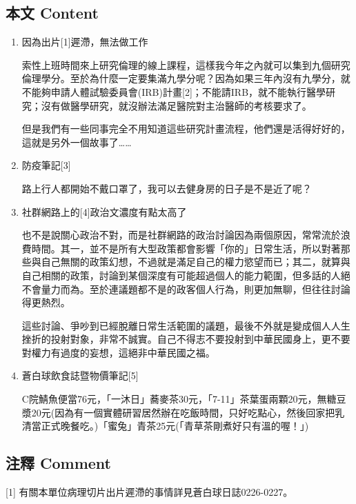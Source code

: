 \documentclass[a5paper, 12pt
]{book}
\begin{document}
\hypertarget{ux672cux6587-content-75}{%
\subsection{本文 Content}\label{ux672cux6587-content-75}}

\begin{enumerate}
\def\labelenumi{\arabic{enumi}.}
\item
  因為出片{[}1{]}遲滯，無法做工作

  索性上班時間來上研究倫理的線上課程，這樣我今年之內就可以集到九個研究倫理學分。至於為什麼一定要集滿九學分呢？因為如果三年內沒有九學分，就不能夠申請人體試驗委員會(IRB)計畫{[}2{]}；不能請IRB，就不能執行醫學研究；沒有做醫學研究，就沒辦法滿足醫院對主治醫師的考核要求了。

  但是我們有一些同事完全不用知道這些研究計畫流程，他們還是活得好好的，這就是另外一個故事了\ldots\ldots{}
\item
  防疫筆記{[}3{]}

  路上行人都開始不戴口罩了，我可以去健身房的日子是不是近了呢？
\item
  社群網路上的{[}4{]}政治文濃度有點太高了

  也不是說關心政治不對，而是社群網路的政治討論因為兩個原因，常常流於浪費時間。其一，並不是所有大型政策都會影響「你的」日常生活，所以對著那些與自己無關的政策幻想，不過就是滿足自己的權力慾望而已；其二，就算與自己相關的政策，討論到某個深度有可能超過個人的能力範圍，但多話的人絕不會量力而為。至於連議題都不是的政客個人行為，則更加無聊，但往往討論得更熱烈。

  這些討論、爭吵到已經脫離日常生活範圍的議題，最後不外就是變成個人人生挫折的投射對象，非常不誠實。自己不得志不要投射到中華民國身上，更不要對權力有過度的妄想，這絕非中華民國之福。
\item
  蒼白球飲食誌暨物價筆記{[}5{]}

  C院鯖魚便當76元，「一沐日」蕎麥茶30元，「7-11」茶葉蛋兩顆20元，無糖豆漿20元(因為有一個實體研習居然辦在吃飯時間，只好吃點心，然後回家把乳清當正式晚餐吃。)「蜜兔」青茶25元(「青草茶剛煮好只有溫的喔！」)
\end{enumerate}

\hypertarget{ux6ce8ux91cb-comment-75}{%
\subsection{注釋 Comment}\label{ux6ce8ux91cb-comment-75}}

{[}1{]} 有關本單位病理切片出片遲滯的事情詳見蒼白球日誌0226-0227。
\end{document}
